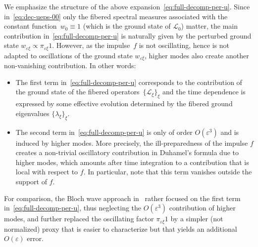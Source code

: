 \documentclass[10pt]{amsart}
\theoremstyle{plain}
\theoremstyle{definition}
\numberwithin{equation}{section}
\newcommand{\e}{\varepsilon}
\newcommand{\Lc}{\mathcal{L}}
\begin{document}
We emphasize the structure of the above expansion~\eqref{eq:full-decomp-per-u}.
Since in~\eqref{eq:dec-ueps-00} only the fibered spectral measures associated with the constant function~$w_0\equiv1$ {(which is the ground state of $\Lc_0$)} matter, the main contribution in~\eqref{eq:full-decomp-per-u} is naturally given by the perturbed ground state $w_{\e\xi}\propto\pi_{\e\xi}1$. However, as the impulse~$f$ is not oscillating, hence is not adapted to oscillations of the ground state $w_{\e\xi}$, higher modes also create another non-vanishing contribution. In other words:
\begin{itemize}
\item The first term in~\eqref{eq:full-decomp-per-u} corresponds to the contribution of the ground state of the fibered operators~$\{\Lc_\xi\}_\xi$ and the time dependence is expressed by some effective evolution determined by the fibered ground eigenvalues $\{\lambda_\xi\}_\xi$.
\item The second term in~\eqref{eq:full-decomp-per-u} is only of order $O(\e^3)$ and is induced by higher modes. More precisely, the ill-preparedness of the impulse $f$ creates a non-trivial oscillatory contribution in Duhamel's formula due to higher modes, which amounts after time integration to a contribution that is local with respect to $f$.
In particular, note that this term vanishes outside the support of $f$.
\end{itemize}
For comparison, the Bloch wave approach in~\cite{Lamacz-11,DLS-14,DLS-15,BG} rather focused on the first term in~\eqref{eq:full-decomp-per-u}, thus neglecting the $O(\e^3)$ contribution of higher modes, and further replaced the oscillating factor $\pi_{\e\xi}1$ by a simpler (not normalized) proxy that is easier to characterize but that yields an additional $O(\e)$ error.
\end{document}
